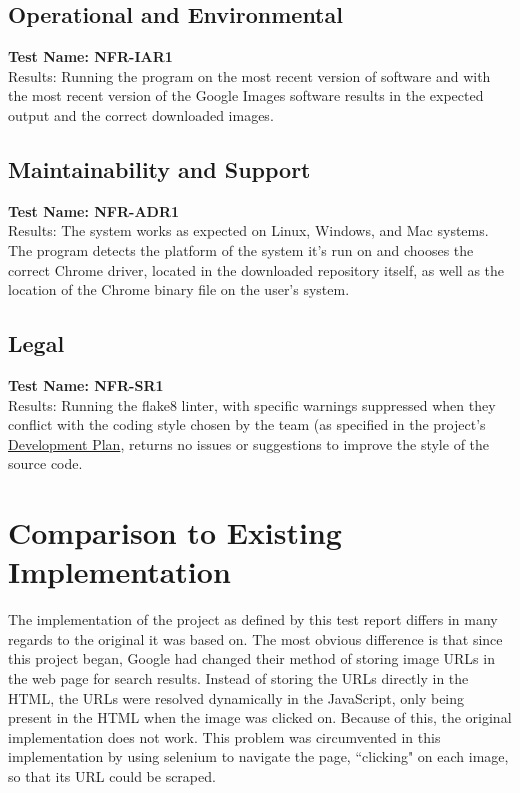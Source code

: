 \documentclass[12pt, titlepage]{article}
\begin{document}
\subsection{Operational and Environmental}
\textbf{Test Name: NFR-IAR1}\\
Results: Running the program on the most recent version of software and with the most recent version of the Google Images software results in the expected output and the correct downloaded images.

\subsection{Maintainability and Support}
\textbf{Test Name: NFR-ADR1}\\
Results: The system works as expected on Linux, Windows, and Mac systems. The program detects the platform of the system it's run on and chooses the correct Chrome driver, located in the downloaded repository itself, as well as the location of the Chrome binary file on the user's system.

\subsection{Legal}
\textbf{Test Name: NFR-SR1}\\
Results: Running the flake8 linter, with specific warnings suppressed when they conflict with the coding style chosen by the team (as specified in the project's \href{https://gitlab.cas.mcmaster.ca/guinnesj/google-images-downloader/-/blob/master/Doc/DevelopmentPlan/DevelopmentPlan.pdf}{Development Plan}, returns no issues or suggestions to improve the style of the source code.
	
\section{Comparison to Existing Implementation}	

The implementation of the project as defined by this test report differs in many regards to the original it was based on. The most obvious difference is that since this project began, Google had changed their method of storing image URLs in the web page for search results. Instead of storing the URLs directly in the HTML, the URLs were resolved dynamically in the JavaScript, only being present in the HTML when the image was clicked on. Because of this, the original implementation does not work. This problem was circumvented in this implementation by using selenium to navigate the page, ``clicking" on each image, so that its URL could be scraped.
\end{document}

